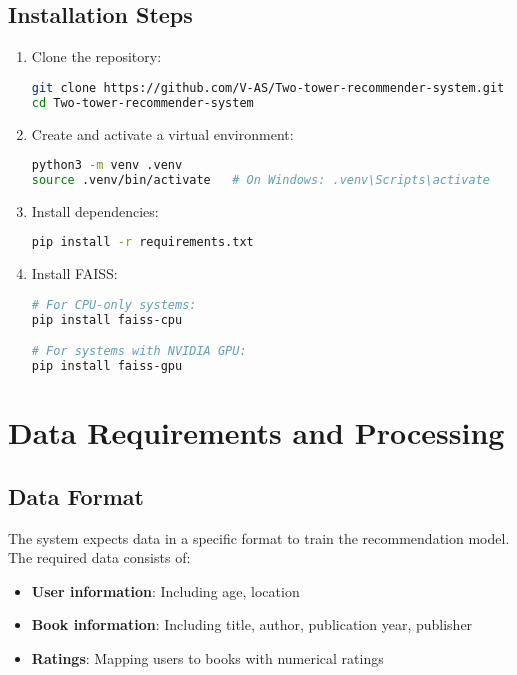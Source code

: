 \documentclass[12pt, a4paper, oneside]{book}
\begin{document}
\section{Installation Steps}

\begin{enumerate}
    \item Clone the repository:
    
    \begin{lstlisting}[language=bash]
git clone https://github.com/V-AS/Two-tower-recommender-system.git
cd Two-tower-recommender-system
    \end{lstlisting}
    
    \item Create and activate a virtual environment:
    
    \begin{lstlisting}[language=bash]
python3 -m venv .venv
source .venv/bin/activate   # On Windows: .venv\Scripts\activate
    \end{lstlisting}
    
    \item Install dependencies:
    
    \begin{lstlisting}[language=bash]
pip install -r requirements.txt
    \end{lstlisting}
    
    \item Install FAISS:
    
    \begin{lstlisting}[language=bash]
# For CPU-only systems:
pip install faiss-cpu

# For systems with NVIDIA GPU:
pip install faiss-gpu
    \end{lstlisting}
\end{enumerate}


\chapter{Data Requirements and Processing}

\section{Data Format}
The system expects data in a specific format to train the recommendation model. The required data consists of:

\begin{itemize}
    \item \textbf{User information}: Including age, location
    \item \textbf{Book information}: Including title, author, publication year, publisher
    \item \textbf{Ratings}: Mapping users to books with numerical ratings
\end{itemize}
\end{document}
